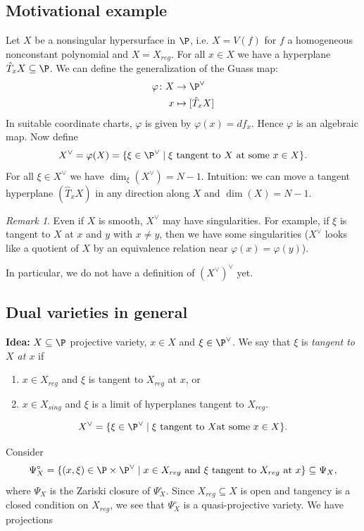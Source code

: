 \documentclass[A4paper, british]{amsart}
\theoremstyle{darkgreentheorem}
\theoremstyle{darkbluedefinition}
\theoremstyle{darkredexample}
\theoremstyle{remark}
\newtheorem{rem}[thm]{Remark}
\newcommand{\1}{\mathbbm{1}}
\newcommand{\dual}{^{\vee}}
\newcommand{\tms}{\times}
\newcommand{\sub}{\subseteq}
\begin{document}
\subsection{Motivational example}
Let $X$ be a nonsingular hypersurface in $\P$, i.e. $X=V(f)$ for $f$ a homogeneous nonconstant polynomial and $X=X_{reg}$.
For all $x\in X$ we have a hyperplane $\hat{T}_{x}X\sub \P$.
We can define the generalization of the Guass map:
\begin{align*}
    \varphi\colon X & \to \P\dual \\
    x & \mapsto [\hat{T}_{x}X]
\end{align*}
In suitable coordinate charts, $\varphi$ is given by $\varphi(x)=df_{x}$.
Hence $\varphi$ is an algebraic map.
Now define
\[ X\dual=\varphi(X)=\{\xi\in \P\dual \mid \xi \text{ tangent to }X\text{ at some }x\in X\}. \]
For all $\xi\in X\dual$ we have $\dim_{\xi}(X\dual)=N-1$.
Intuition: we can move a tangent hyperplane $(\hat{T}_{x}X)$ in any direction along $X$ and $\dim(X)=N-1$.

\begin{rem}
    Even if $X$ is smooth, $X\dual$ may have singularities.
    For example, if $\xi$ is tangent to $X$ at $x$ and $y$ with $x\neq y$, then we have some singularities ($X\dual$ looks like a quotient of $X$ by an equivalence relation near $\varphi(x)=\varphi(y)$).

    In particular, we do not have a definition of $(X\dual)\dual$ yet.
\end{rem}

\subsection{Dual varieties in general}

\textbf{Idea:} $X\sub \P$ projective variety, $x\in X$ and $\xi\in \P\dual$.
We say that $\xi$ is \textit{tangent to $X$ at $x$} if
\begin{enumerate}
    \item $x\in X_{reg}$ and $\xi$ is tangent to $X_{reg}$ at $x$, or
    \item $x\in X_{sing}$ and $\xi$ is a limit of hyperplanes tangent to $X_{reg}$.
\end{enumerate}
\[ X\dual=\{\xi\in \P\dual \mid \xi \text{ tangent to }X\text{at some }x\in X\}. \]

Consider
\[ \Psi_{X}^{\circ}=\{(x,\xi)\in \P\tms \P\dual \mid x\in X_{reg} \text{ and }\xi\text{ tangent to }X_{reg} \text{ at } x\} \sub \Psi_{X}, \]
where $\Psi_{X}$ is the Zariski closure of $\Psi_{X}^{\circ}$.
Since $X_{reg}\sub X$ is open and tangency is a closed condition on $X_{reg}$, we see that $\Psi_{X}^{\circ}$ is a quasi-projective variety.
We have projections
\begin{center}
\end{center}
\end{document}
